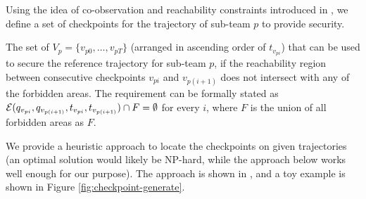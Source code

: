 \documentclass[journal]{IEEEtran}  %
\begin{document}
Using the idea of co-observation and reachability constraints introduced in , we define a set of checkpoints for the trajectory of sub-team $p$ to provide security. 

\begin{definition}
The set of $V_{p}=\{ v_{p0}, \dots ,v_{pT}\}$ (arranged in ascending order of $t_{v_{pi}}$) that can be used to secure the reference trajectory for sub-team $p$, if the reachability region between consecutive checkpoints $v_{pi}$ and $v_{p(i+1)}$ does not intersect with any of the forbidden areas. The requirement can be formally stated as $\mathcal{E}(q_{v_{pi}}, q_{v_{p(i+1)}}, t_{v_{pi}},t_{v_{p(i+1)}}) \cap F = \emptyset$ for every $i$, where $F$ is the union of all forbidden areas as $F$. 
\end{definition}

We provide a heuristic approach to locate the checkpoints on given trajectories (an optimal solution would likely be NP-hard, while the approach below works well enough for our purpose). The approach is shown in , and a toy example is shown in Figure \ref{fig:checkpoint-generate}. 
\end{document}
